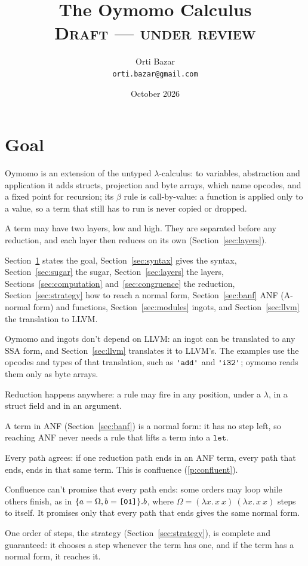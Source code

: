 \documentclass[11pt,letterpaper]{article}
\title{The Oymomo Calculus\\[8pt]\normalsize\textsc{Draft --- under review}}
\author{Orti Bazar\\ \texttt{orti.bazar@gmail.com}}
\date{October 2026}
\newcommand{\lam}[2]{\lambda #1.\,#2}       %
\newcommand{\kw}[1]{\mathtt{#1}}
\newcommand{\str}[1]{\text{\ttfamily\textquotesingle #1\textquotesingle}}  %
\newcommand{\hex}[1]{\text{\ttfamily [#1]}}  %
\newcommand{\pref}[1]{\ref{#1}}  %
\begin{document}
\maketitle






\section{Goal}\label{sec:goal}

\begin{points}
\item Oymomo is an extension of the untyped $\lambda$-calculus: to variables, abstraction and
  application it adds structs, projection and byte arrays, which name
  opcodes, and a fixed point for recursion; its $\beta$ rule is call-by-value: a function is applied only to a value, so a term that still has to run is never copied or dropped.
\item A term may have two layers, low and high. They are separated before any
  reduction, and each layer then reduces on its own (Section~\ref{sec:layers}).
\item Section~\ref{sec:goal} states the goal, Section~\ref{sec:syntax} gives the syntax, Section~\ref{sec:sugar} the sugar,
  Section~\ref{sec:layers} the layers,
  Sections~\ref{sec:computation} and~\ref{sec:congruence} the reduction, Section~\ref{sec:strategy} how to reach a normal form, Section~\ref{sec:banf} ANF (A-normal form) and functions, Section~\ref{sec:modules} ingots, and Section~\ref{sec:llvm} the translation to LLVM.
\item Oymomo and ingots don't depend on LLVM: an ingot can be translated to any SSA form, and
  Section~\ref{sec:llvm} translates it to LLVM's. The examples use the opcodes and
  types of that translation, such as $\str{add}$ and $\str{i32}$; oymomo reads them only as byte arrays.
\item\label{p:goal-anywhere} Reduction happens anywhere: a rule may fire in any position, under a
  $\lambda$, in a struct field and in an argument.
\item\label{p:goal-banf} A term in ANF (Section~\ref{sec:banf}) is a normal form: it
  has no step left, so reaching ANF never needs a rule that lifts a term into a $\kw{let}$.
\item\label{p:goal-agree} Every path agrees: if one reduction path ends in an ANF term, every path that ends,
  ends in that same term. This is confluence (\pref{p:confluent}).
\item\label{p:goal-ends} Confluence can't promise that every path ends:  some orders may loop while
  others finish, as in $\{a = \Omega, b = \hex{01}\}.b$, where $\Omega = (\lam{x}{x\ x})\ (\lam{x}{x\ x})$ steps to itself. It promises only that every path that ends gives the same normal form.
\item\label{p:goal-strategy} One order of steps, the strategy (Section~\ref{sec:strategy}), is complete and guaranteed: it
  chooses a step whenever the term has one, and if the term has a normal form, it reaches it.
\end{points}
\end{document}
